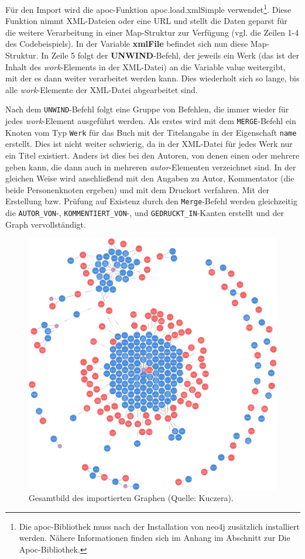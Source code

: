 \documentclass[ngerman,]{scrreprt}
\begin{document}
Für den Import wird die apoc-Funktion apoc.load.xmlSimple verwendet\footnote{Die apoc-Bibliothek muss nach der Installation von neo4j zusätzlich installiert werden. Nähere Informationen finden sich im Anhang im Abschnitt zur Die Apoc-Bibliothek.}. Diese Funktion nimmt XML-Dateien oder eine URL und stellt die Daten geparst für die weitere Verarbeitung in einer Map-Struktur zur Verfügung (vgl. die Zeilen 1-4 des Codebeispiels). In der Variable \textbf{xmlFile} befindet sich nun diese Map-Struktur. In Zeile 5 folgt der \textbf{UNWIND}-Befehl, der jeweils ein Werk (das ist der Inhalt des \emph{work}-Elements in der XML-Datei) an die Variable value weitergibt, mit der es dann weiter verarbeitet werden kann. Dies wiederholt sich so lange, bis alle \emph{work}-Elemente der XML-Datei abgearbeitet sind.

Nach dem \texttt{UNWIND}-Befehl folgt eine Gruppe von Befehlen, die immer wieder für jedes \emph{work}-Element ausgeführt werden. Als erstes wird mit dem \texttt{MERGE}-Befehl ein Knoten vom Typ \texttt{Werk} für das Buch mit der Titelangabe in der Eigenschaft \texttt{name} erstellt. Dies ist nicht weiter schwierig, da in der XML-Datei für jedes Werk nur ein Titel existiert. Anders ist dies bei den Autoren, von denen einen oder mehrere geben kann, die dann auch in mehreren \emph{autor}-Elementen verzeichnet sind. In der gleichen Weise wird anschließend mit den Angaben zu Autor, Kommentator (die beide Personenknoten ergeben) und mit dem Druckort verfahren. Mit der Erstellung bzw. Prüfung auf Existenz durch den \texttt{Merge}-Befehl werden gleichzeitig die \texttt{AUTOR\_VON}-, \texttt{KOMMENTIERT\_VON}-, und \texttt{GEDRUCKT\_IN}-Kanten erstellt und der Graph vervollständigt.

\begin{figure}
\centering
\includegraphics{Bilder/Kollatz-Druckernetzwerk.png}
\caption{Gesamtbild des importierten Graphen (Quelle: Kuczera).}
\end{figure}
\end{document}
